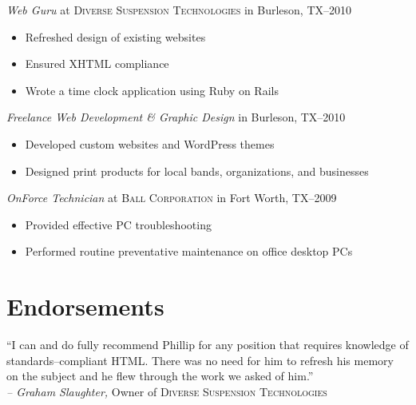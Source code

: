 \documentclass[margin]{res}
\begin{document}
\begin{resume}
                \textit{Web Guru}
                 at \textsc{Diverse Suspension Technologies} in Burleson, TX--2010
                 \vspace{-10pt}\begin{itemize} \itemsep -2pt %
                   \item Refreshed design of existing websites
                   \item Ensured XHTML compliance
                   \item Wrote a time clock application using Ruby on Rails
                \end{itemize}
                
                \textit{Freelance Web Development \textrm{\&} Graphic Design}
                in Burleson, TX--2010
                \vspace{-10pt}\begin{itemize} \itemsep -2pt %
                  \item Developed custom websites and WordPress themes
                  \item Designed print products for local bands, organizations, and businesses
                \end{itemize}
                
                \textit{OnForce Technician}
                at \textsc{Ball Corporation} in Fort Worth, TX--2009
                \vspace{-10pt}\begin{itemize} \itemsep -2pt %
                  \item Provided effective PC troubleshooting
                  \item Performed routine preventative maintenance on office desktop PCs
                \end{itemize}

\vspace{10pt}

      
\section{\textsf{Endorsements}}

                ``I can and do fully recommend Phillip for any position that requires 
                knowledge of standards--compliant HTML. There was no need for him to refresh his 
                memory on the subject and he flew through the work we asked of him.''             \\
                \textit{-- Graham Slaughter,} Owner of \textsc{Diverse Suspension Technologies}


\end{resume}
\end{document}
